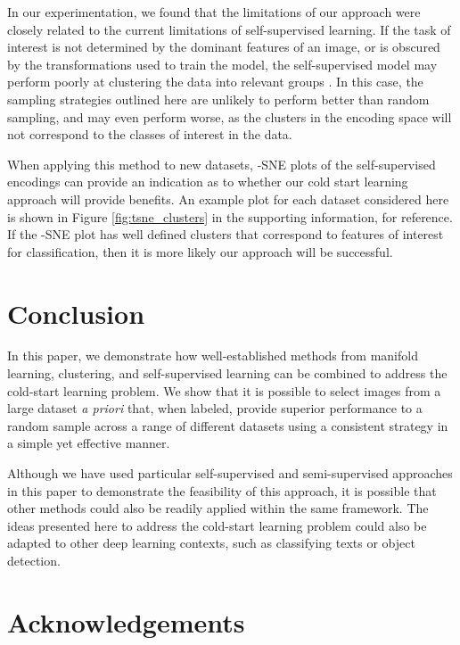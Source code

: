 \documentclass{article}
\begin{document}
In our experimentation, we found that the limitations of our approach were closely related to the current limitations of self-supervised learning. If the task of interest is not determined by the dominant features of an image, or is obscured by the transformations used to train the model, the self-supervised model may perform poorly at clustering the data into relevant groups \citep{chen2021intriguing}. In this case, the sampling strategies outlined here are unlikely to perform better than random sampling, and may even perform worse, as the clusters in the encoding space will not correspond to the classes of interest in the data.

When applying this method to new datasets, -SNE plots of the self-supervised encodings can provide an indication as to whether our cold start learning approach will provide benefits. An example plot for each dataset considered here is shown in Figure \ref{fig:tsne_clusters} in the supporting information, for reference. If the -SNE plot has well defined clusters that correspond to features of interest for classification, then it is more likely our approach will be successful.

\section{Conclusion}

In this paper, we demonstrate how well-established methods from manifold learning, clustering, and self-supervised learning can be combined to address the cold-start learning problem. We show that it is possible to select images from a large dataset \textit{a priori} that, when labeled, provide superior performance to a random sample across a range of different datasets using a consistent strategy in a simple yet effective manner.

Although we have used particular self-supervised and semi-supervised approaches in this paper to demonstrate the feasibility of this approach, it is possible that other methods could also be readily applied within the same framework. The ideas presented here to address the cold-start learning problem could also be adapted to other deep learning contexts, such as classifying texts or object detection. 

\pagebreak

\section{Acknowledgements}
\end{document}
